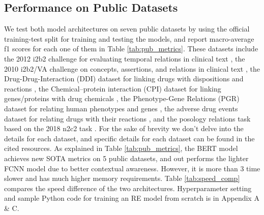 \documentclass[letterpaper]{article}
\begin{document}
\subsection{Performance on Public Datasets}
We test both model architectures on seven public datasets by using the official training-test split for training and testing the models, and report macro-average f1 scores for each one of them in Table \ref{tab:pub_metrics}. These datasets include the 2012 i2b2 challenge for evaluating temporal relations in clinical text \cite{article}, the 2010 i2b2/VA challenge on concepts, assertions, and relations in clinical text \cite{uzuner20112010}, the Drug-Drug-Interaction (DDI) dataset for linking drugs with dispositions and reactions \cite{HERREROZAZO2013914}, the Chemical–protein interaction (CPI) dataset for linking genes/proteins with drug chemicals \cite{Krallinger2017OverviewOT}, the Phenotype-Gene Relations (PGR) dataset for relating human phenotypes and genes \cite{sousa-etal-2019-silver}, the adverse drug events dataset for relating drugs with their reactions \cite{GURULINGAPPA2012885}, and the posology relations task based on the 2018 n2c2 task \cite{henry20202018}.  For the sake of brevity we don't delve into the details for each dataset, and specific details for each dataset can be found in the cited resources. As explained in Table \ref{tab:pub_metrics}, the BERT model achieves new SOTA metrics on 5 public datasets, and out performs the lighter FCNN model due to better contextual awareness. However, it is more than 3 time slower and has much higher memory requirements. Table \ref{tab:speed_comp} compares the speed difference of the two architectures. Hyperparameter setting and sample Python code for training an RE model from scratch is in Appendix A \& C.
\end{document}
